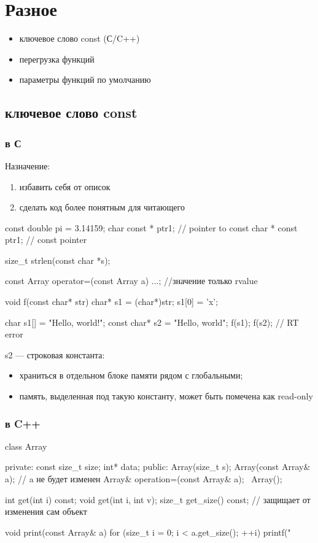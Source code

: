 \section{Разное}
\begin{itemize}[noitemsep]
    \item ключевое слово const (С/C++)
    \item перегрузка функций
    \item параметры функций по умолчанию
\end{itemize}
\subsection{ключевое слово const}
\subsubsection{в С}
Назначение:
$ $
\begin{enumerate}[noitemsep]
    \item избавить себя от описок
	\item сделать код более понятным для читающего
\end{enumerate}
\begin{cppcode}
const double pi = 3.14159;
char const * ptr1; // pointer to const
char * const ptr1; // const pointer

size_t strlen(const char *s);

const Array operator=(const Array a) {...}; //значение только rvalue

void f(const char* str) {
    char* s1 = (char*)str;
    s1[0] = 'x';
}
\end{cppcode}
\begin{cppcode}
char s1[] = "Hello, world!";
const char* s2 = "Hello, world";
f(s1);
f(s2); // RT error
\end{cppcode}
s2 --- строковая константа:
\begin{itemize}[noitemsep]
    \item храниться в отдельном блоке памяти рядом с глобальными;
    \item память, выделенная под такую константу, может быть помечена как read-only 
\end{itemize}
\subsubsection{в C++}
\begin{cppcode}
class Array {
private:
    const size_t size; 
    int* data;
public:
    Array(size_t s);
    Array(const Array& a); // a не будет изменен
    Array& operation=(const Array& a);
    ~Array();

    int get(int i) const;
    void get(int i, int v);
    size_t get_size() const; // защищает от изменения сам объект
}
\end{cppcode}
\begin{cppcode}
void print(const Array& a) {
    for (size_t i = 0; i < a.get_size(); ++i) 
	printf("%
}
\end{cppcode}
